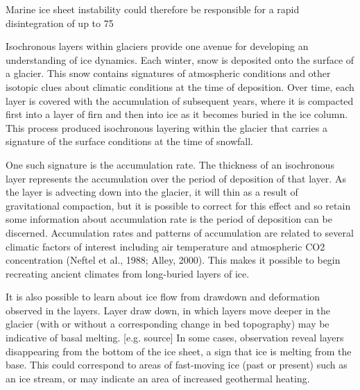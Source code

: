 \documentclass[draft,jgrga]{agutex}
\begin{document}
	Marine ice sheet instability could therefore be responsible for a rapid disintegration of up to 75%

	Isochronous layers within glaciers provide one avenue for developing an understanding of ice dynamics.  Each winter, snow is deposited onto the surface of a glacier. This snow contains signatures of atmospheric conditions and other isotopic clues about climatic conditions at the time of deposition. Over time, each layer is covered with the accumulation of subsequent years, where it is compacted first into a layer of firn and then into ice as it becomes buried in the ice column. This process produced isochronous layering within the glacier that carries a signature of the surface conditions at the time of snowfall.  

	One such signature is the accumulation rate.  The thickness of an isochronous layer represents the accumulation over the period of deposition of that layer. As the layer is advecting down into the glacier, it will thin as a result of gravitational compaction, but it is possible to correct for this effect and so retain some information about accumulation rate is the period of deposition can be discerned. Accumulation rates and patterns of accumulation are related to several climatic factors of interest including air temperature and atmospheric CO2 concentration (Neftel et al., 1988; Alley, 2000). This makes it possible to begin recreating ancient climates from long-buried layers of ice. 

	It is also possible to learn about ice flow from drawdown and deformation observed in the layers. Layer draw down, in which layers move deeper in the glacier (with or without a corresponding change in bed topography) may be indicative of basal melting. [e.g. source] In some cases, observation reveal layers disappearing from the bottom of the ice sheet, a sign that ice is melting from the base. This could correspond to areas of fast-moving ice (past or present) such as an ice stream, or may indicate an area of increased geothermal heating.	
\end{document}
